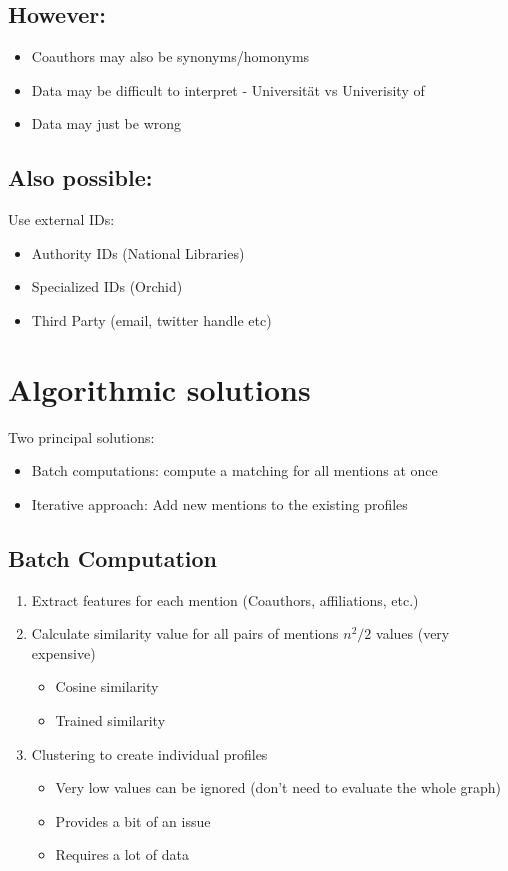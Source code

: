 \documentclass[10pt,a4paper]{scrreprt}
\begin{document}
\subsection{However:}
\begin{itemize}
	\item Coauthors may also be synonyms/homonyms
	\item Data may be difficult to interpret - Universität vs Univerisity of
	\item Data may just be wrong
\end{itemize}

\subsection{Also possible:}
Use external IDs:
\begin{itemize}
	\item Authority IDs (National Libraries)
	\item Specialized IDs (Orchid)
	\item Third Party (email, twitter handle etc)
\end{itemize}

\section{Algorithmic solutions}
Two principal solutions:
\begin{itemize}
	\item Batch computations: compute a matching for all mentions at once
	\item Iterative approach: Add new mentions to the existing profiles
\end{itemize}

\subsection{Batch Computation}
\begin{enumerate}
	\item Extract features for each mention (Coauthors, affiliations, etc.)
	\item Calculate similarity value for all pairs of mentions $n^2/2$ values (very expensive)
	\begin{itemize}
		\item Cosine similarity
		\item Trained similarity
	\end{itemize}
	\item Clustering to create individual profiles
	\begin{itemize}
		\item Very low values can be ignored (don't need to evaluate the whole graph)
		\item Provides a bit of an issue
		\item Requires a lot of data
	\end{itemize}
\end{enumerate}
\end{document}
